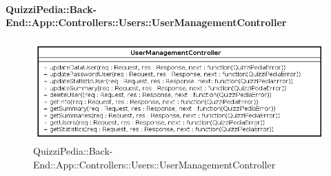 \paragraph[QuizziPedia::Back-End::App::Controllers::Users\\::UserManagementController]{QuizziPedia::Back-End::App::Controllers::Users::UserManagementController}
\label{QuizziPedia::Back-End::App::Controllers::Users::UserManagementController}
\begin{figure}[ht]
	\centering
	\includegraphics[scale=0.45]{UML/Classi/Back-End/QuizziPedia_Back-End_App_Controllers_Users_UserManagementController.png}
	\caption{QuizziPedia::Back-End::App::Controllers::Users::UserManagementController}
\end{figure}
\FloatBarrier
